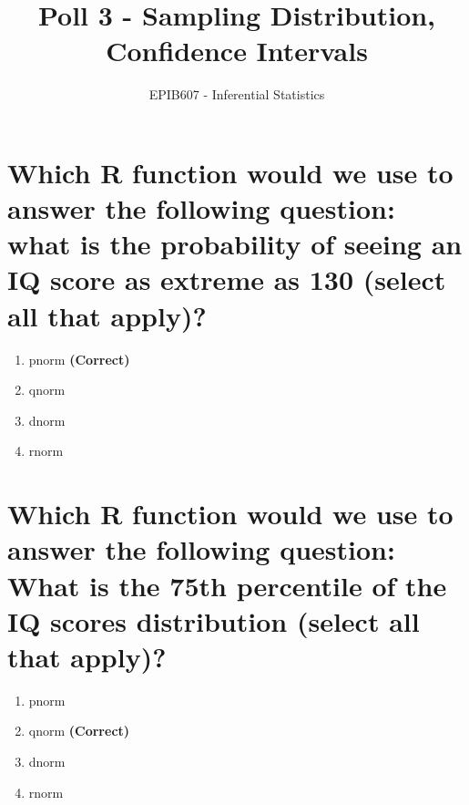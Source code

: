 \documentclass[letterpaper,10pt,twoside,printwatermark=false]{pinp}
\title{Poll 3 - Sampling Distribution, Confidence Intervals}
\author[a]{EPIB607 - Inferential Statistics}
\affil[a]{Fall 2018, McGill University}
\providecommand{\tightlist}{%
  \setlength{\itemsep}{0pt}\setlength{\parskip}{0pt}}
\begin{document}
\verticaladjustment{-2pt}

\maketitle
\thispagestyle{firststyle}



\section{Which R function would we use to answer the following question:
what is the probability of seeing an IQ score as extreme as 130 (select
all that
apply)?}\label{which-r-function-would-we-use-to-answer-the-following-question-what-is-the-probability-of-seeing-an-iq-score-as-extreme-as-130-select-all-that-apply}

\begin{enumerate}
\def\labelenumi{\arabic{enumi}.}
\tightlist
\item
  pnorm \textbf{(Correct)}
\item
  qnorm
\item
  dnorm
\item
  rnorm
\end{enumerate}

\section{Which R function would we use to answer the following question:
What is the 75th percentile of the IQ scores distribution (select all
that
apply)?}\label{which-r-function-would-we-use-to-answer-the-following-question-what-is-the-75th-percentile-of-the-iq-scores-distribution-select-all-that-apply}

\begin{enumerate}
\def\labelenumi{\arabic{enumi}.}
\tightlist
\item
  pnorm
\item
  qnorm \textbf{(Correct)}
\item
  dnorm
\item
  rnorm
\end{enumerate}
\end{document}
